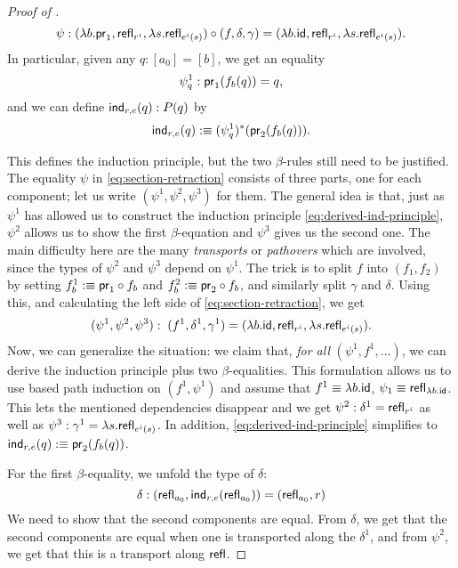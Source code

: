 \begin{proof}[Proof of ]
 \begin{equation} \label{eq:section-retraction}
  \psi: (\lambda b. \mathsf{pr}_1,\mathsf{refl}_{r^i},\lambda s. \mathsf{refl}_{e^i(s)}) \circ (f, \delta, \gamma)
   = (\lambda b. \mathsf{id}, \mathsf{refl}_{r^i}, \lambda s. \mathsf{refl}_{e^i(s)}) \text{.}
 \end{equation}
In particular, given any $q : [a_0] = [b]$, we get an equality
 \begin{equation} \label{eq:proj1-f}
  \psi^1_q : \mathsf{pr}_1(f_b(q)) = q \text{,}
 \end{equation}
and we can define $\mathsf{ind}_{r,e}(q) : P(q)$ by
 \begin{equation}
  \mathsf{ind}_{r,e}(q) :\equiv (\psi^1_q)^*(\mathsf{pr}_2(f_b(q))). \label{eq:derived-ind-principle}
 \end{equation}

This defines the induction principle, but the two $\beta$-rules still need to
be justified.
The equality $\psi$ in \eqref{eq:section-retraction} consists of three parts,
one for each component;
let us write $(\psi^1, \psi^2, \psi^3)$ for them.
The general idea is that, just as $\psi^1$ has allowed us to construct
the induction principle \eqref{eq:derived-ind-principle},
$\psi^2$ allows us to show the first $\beta$-equation and $\psi^3$ gives us the
second one.
The main difficulty here are the many \emph{transports} or \emph{pathovers}
which are involved, since the types of $\psi^2$ and $\psi^3$ depend on $\psi^1$.
The trick is to split $f$ into $(f_1, f_2)$ by setting $f_b^1 :\equiv \mathsf{pr}_1 \circ f_b$
and $f_b^2 :\equiv \mathsf{pr}_2 \circ f_b$, and similarly split $\gamma$ and $\delta$.
Using this, and calculating the left side of \eqref{eq:section-retraction}, we get
 \begin{equation*}
  (\psi^1, \psi^2, \psi^3) : \; (f^1, \delta^1, \gamma^1) = (\lambda b. \mathsf{id}, \mathsf{refl}_{r^i}, \lambda s. \mathsf{refl}_{e^i(s)}) \text{.}
 \end{equation*}
 Now, we can generalize the situation: we claim that, \emph{for all} $(\psi^1, f^1, \ldots)$,
 we can derive the induction principle plus two $\beta$-equalities.
 This formulation allows us to use based path induction on $(f^1, \psi^1)$ and
 assume that $f^1 \equiv \lambda b.\mathsf{id}$, $\psi_1 \equiv \mathsf{refl}_{\lambda b.\mathsf{id}}$.
 This lets the mentioned dependencies disappear and we get $\psi^2 : \delta^1 = \mathsf{refl}_{r^i}$ 
 as well as $\psi^3 : \gamma^1 = \lambda s.\mathsf{refl}_{e^i(s)}$.
 In addition, \eqref{eq:derived-ind-principle} simplifies to $\mathsf{ind}_{r,e}(q) :\equiv \mathsf{pr}_2(f_b(q))$.

 For the first $\beta$-equality, we unfold the type of $\delta$:
 \begin{equation*}
  \delta : (\mathsf{refl}_{a_0}, \mathsf{ind}_{r,e}(\mathsf{refl}_{a_0})) = (\mathsf{refl}_{a_0}, r)
 \end{equation*}
 We need to show that the second components are equal.
 From $\delta$, we get that the second components are equal when one is
 transported along the $\delta^1$,
 and from $\psi^2$, we get that this is a transport along $\mathsf{refl}$.



\end{proof}
